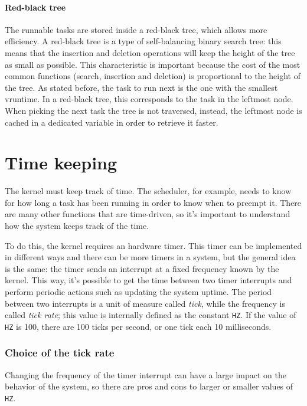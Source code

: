 \paragraph{Red-black tree}
\label{sec:rb-tree}
The runnable tasks are stored inside a red-black tree, which allows more efficiency. A red-black tree is a type of self-balancing binary search tree: this means that the insertion and deletion operations will keep the height of the tree as small as possible. This characteristic is important because the cost of the most common functions (search, insertion and deletion) is proportional to the height of the tree.
As stated before, the task to run next is the one with the smallest vruntime. In a red-black tree, this corresponds to the task in the leftmost node. When picking the next task the tree is not traversed, instead, the leftmost node is cached in a dedicated variable in order to retrieve it faster.

\section{Time keeping}
\label{sec:timekeeping}
The kernel must keep track of time. The scheduler, for example, needs to know for how long a task has been running in order to know when to preempt it. There are many other functions that are time-driven, so it's important to understand how the system keeps track of the time.

To do this, the kernel requires an hardware timer. This timer can be implemented in different ways and there can be more timers in a system, but the general idea is the same: the timer sends an interrupt at a fixed frequency known by the kernel. This way, it's possible to get the time between two timer interrupts and perform periodic actions such as updating the system uptime. The period between two interrupts is a unit of measure called \textit{tick}, while the frequency is called \textit{tick rate}; this value is internally defined as the constant \texttt{HZ}. If the value of \texttt{HZ} is 100, there are 100 ticks per second, or one tick each 10 milliseconds.

\subsubsection{Choice of the tick rate}
Changing the frequency of the timer interrupt can have a large impact on the behavior of the system, so there are pros and cons to larger or smaller values of \texttt{HZ}.

